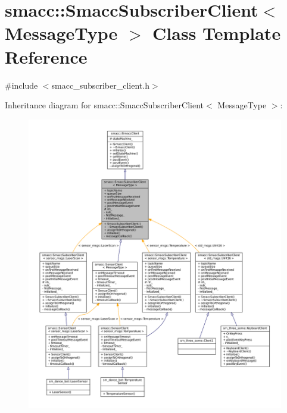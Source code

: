 \hypertarget{classsmacc_1_1SmaccSubscriberClient}{}\section{smacc\+:\+:Smacc\+Subscriber\+Client$<$ Message\+Type $>$ Class Template Reference}
\label{classsmacc_1_1SmaccSubscriberClient}


{\ttfamily \#include $<$smacc\+\_\+subscriber\+\_\+client.\+h$>$}



Inheritance diagram for smacc\+:\+:Smacc\+Subscriber\+Client$<$ Message\+Type $>$\+:
\nopagebreak
\begin{figure}[H]
\begin{center}
\leavevmode
\includegraphics[width=350pt]{classsmacc_1_1SmaccSubscriberClient__inherit__graph}
\end{center}
\end{figure}


